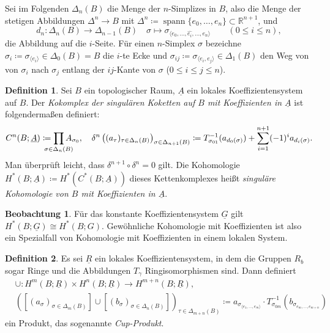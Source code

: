 \documentclass[11pt, a4paper, german]{article}
\theoremstyle{definition}
\newtheorem{defn}{Definition}
\newtheorem{beob}{Beobachtung}
\theoremstyle{remark}
\newcommand{\R}{\mathbb{R}} %
\DeclareMathOperator{\spann}{spann} %
\newcommand{\angles}[1]{{\langle #1 \rangle}}
\begin{document}
Sei im Folgenden $\Delta_n(B)$ die Menge der $n$-Simplizes in $B$, also die Menge der stetigen Abbildungen $\Delta^n \to B$ mit $\Delta^n \coloneqq \spann \{ e_0, \ldots, e_n \} \subset \R^{n+1}$, und
\[
  d_n : \Delta_n(B) \to \Delta_{n-1}(B) \quad
  \sigma \mapsto \sigma_{\angles{e_0, \ldots, \hat{e_i}, \ldots, e_n}} \qquad (0 \leq i \leq n),
\]
die Abbildung auf die $i$-Seite. %
Für einen $n$-Simplex $\sigma$ bezeichne $\sigma_i \coloneqq \sigma_{\angles{e_i}} \in \Delta_0(B) = B$ die $i$-te Ecke und $\sigma_{ij} \coloneqq \sigma_{\angles{e_i, e_j}} \in \Delta_1(B)$ den Weg von von $\sigma_i$ nach $\sigma_j$ entlang der $ij$-Kante von $\sigma$ ($0 \leq i \leq j \leq n$).

\begin{defn}
  Sei $B$ ein topologischer Raum, $\underline{A}$ ein lokales Koeffizientensystem auf $B$.
  Der \emph{Kokomplex der singulären Koketten auf $B$ mit Koeffizienten in $\underline{A}$} ist folgendermaßen definiert:
  \[
    C^n(B; \underline{A}) \coloneqq \prod_{\mathclap{\sigma \in \Delta_n(B)}} A_{\sigma_0}, \quad
    \delta^n\left((a_\tau)_{\tau \in \Delta_n(B)}\right)_{\sigma \in \Delta_{n+1}(B)} \coloneqq T_{\sigma_{01}}^{-1}(a_{d_0(\sigma)}) + \sum_{i=1}^{n+1} (-1)^i a_{d_i(\sigma)}.
  \]
  Man überprüft leicht, dass $\delta^{n+1} \circ \delta^n = 0$ gilt.
  Die Kohomologie $H^*(B; \underline{A}) \coloneqq H^*(C^*(B; \underline{A}))$ dieses Kettenkomplexes heißt \emph{singuläre Kohomologie von $B$ mit Koeffizienten in $\underline{A}$}.
\end{defn}

\begin{beob}
  Für das konstante Koeffizientensystem $\underline{G}$ gilt $H^*(B; \underline{G}) \cong H^*(B; G)$.
  Gewöhnliche Kohomologie mit Koeffizienten ist also ein Spezialfall von Kohomologie mit Koeffizienten in einem lokalen System.
\end{beob}

\begin{defn}
  Es sei $\underline{R}$ ein lokales Koeffizientensystem, in dem die Gruppen $R_b$ sogar Ringe und die Abbildungen $T_\gamma$ Ringisomorphismen sind. Dann definiert
  \begin{align*}
    & \cup : H^m(B; \underline{R}) \times H^n(B; \underline{R}) \to H^{m+n}(B; \underline{R}), \\
    & ([(a_\sigma)_{\sigma \in \Delta_m(B)}] \cup [(b_\sigma)_{\sigma \in \Delta_n(B)}])_{\tau \in \Delta_{m+n}(B)} \coloneqq a_{\sigma_{\angles{e_1, \ldots, e_m}}} \cdot T_{\sigma_{0m}}^{-1}(b_{\sigma_{e_m, \ldots, e_{m+n}}})
  \end{align*}
  ein Produkt, das sogenannte \emph{Cup-Produkt}.
\end{defn}
\end{document}
